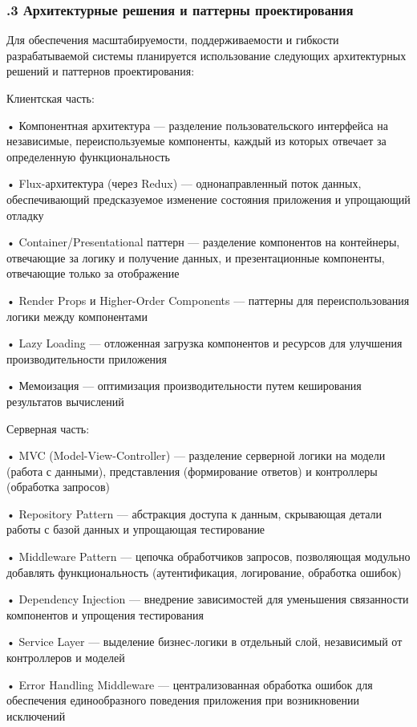 \subtitlespace

\subsubsection*{ 
  \gostTitleFont
  .3 Архитектурные решения и паттерны проектирования
} 

\subtitlespace

{\gostFont

  \par \redline Для обеспечения масштабируемости, поддерживаемости и гибкости разрабатываемой системы планируется использование следующих архитектурных решений и паттернов проектирования:

  \par \redline Клиентская часть:

  \par \redline • Компонентная архитектура — разделение пользовательского интерфейса на независимые, переиспользуемые компоненты, каждый из которых отвечает за определенную функциональность
  \par \redline • Flux-архитектура (через Redux) — однонаправленный поток данных, обеспечивающий предсказуемое изменение состояния приложения и упрощающий отладку
  \par \redline • Container/Presentational паттерн — разделение компонентов на контейнеры, отвечающие за логику и получение данных, и презентационные компоненты, отвечающие только за отображение
  \par \redline • Render Props и Higher-Order Components — паттерны для переиспользования логики между компонентами
  \par \redline • Lazy Loading — отложенная загрузка компонентов и ресурсов для улучшения производительности приложения
  \par \redline • Мемоизация — оптимизация производительности путем кеширования результатов вычислений

  \par \redline Серверная часть:

  \par \redline • MVC (Model-View-Controller) — разделение серверной логики на модели (работа с данными), представления (формирование ответов) и контроллеры (обработка запросов)
  \par \redline • Repository Pattern — абстракция доступа к данным, скрывающая детали работы с базой данных и упрощающая тестирование
  \par \redline • Middleware Pattern — цепочка обработчиков запросов, позволяющая модульно добавлять функциональность (аутентификация, логирование, обработка ошибок)
  \par \redline • Dependency Injection — внедрение зависимостей для уменьшения связанности компонентов и упрощения тестирования
  \par \redline • Service Layer — выделение бизнес-логики в отдельный слой, независимый от контроллеров и моделей
  \par \redline • Error Handling Middleware — централизованная обработка ошибок для обеспечения единообразного поведения приложения при возникновении исключений

}
